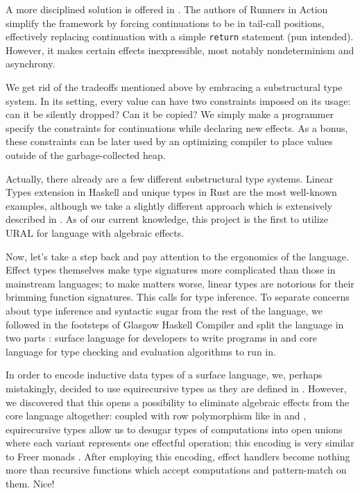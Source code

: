 \documentclass[a4paper,14pt]{extreport}
\begin{document}
A more disciplined solution is offered in \cite{bauer}. The authors of Runners
in Action simplify the framework by forcing continuations to be in tail-call
positions, effectively replacing continuation with a simple \verb|return|
statement (pun intended). However, it makes certain effects inexpressible, most
notably nondeterminism and asynchrony.

We get rid of the tradeoffs mentioned above by embracing a substructural type
system. In its setting, every value can have two constraints imposed on its
usage: can it be silently dropped? Can it be copied? We simply make a programmer
specify the constraints for continuations while declaring new effects. As a
bonus, these constraints can be later used by an optimizing compiler to place
values outside of the garbage-collected heap.

Actually, there already are a few different substructural type systems.
Linear Types extension in Haskell \cite{linear} and unique types in Rust
\cite{rust} are the most well-known examples, although we take a slightly
different approach which is extensively described in \cite{ural}. As of our
current knowledge, this project is the first to utilize URAL for language with
algebraic effects.

Now, let's take a step back and pay attention to the ergonomics of the language.
Effect types themselves make type signatures more complicated than those in
mainstream languages; to make matters worse, linear types are notorious for
their brimming function signatures. This calls for type inference. To separate
concerns about type inference and syntactic sugar from the rest of the language,
we followed in the footsteps of Glasgow Haskell Compiler and split the language
in two parts \cite{ghc}: surface language for developers to write programs in
and core language for type checking and evaluation algorithms to run in.

In order to encode inductive data types of a surface language, we, perhaps
mistakingly, decided to use equirecursive types as they are defined in
\cite{stone}. However, we discovered that this opens a possibility to eliminate
algebraic effects from the core language altogether: coupled with row
polymorphism like in \cite{rowkoka} and \cite{rowcaml}, equirecursive types
allow us to desugar types of computations into open unions where each variant
represents one effectful operation; this encoding is very similar to Freer
monads \cite{exteff}. After employing this encoding, effect handlers become
nothing more than recursive functions which accept computations and
pattern-match on them. Nice!
\end{document}
